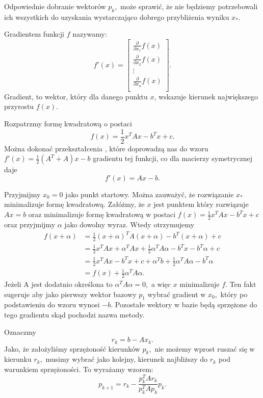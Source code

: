 \documentclass[a4paper,12pt]{book} %
\begin{document}
Odpowiednie dobranie wektorów $p_k,$ może sprawić, że nie będziemy potrzebowali ich wszystkich do uzyskania wystarczająco dobrego przybliżenia wyniku $x_*.$

\begin{df}
Gradientem funkcji $f$ nazywamy:
\[
f'(x) = 
\begin{bmatrix}
\frac{\partial }{\partial x_1}f(x) \\
\frac{\partial }{\partial x_2}f(x) \\
\vdots \\
\frac{\partial }{\partial x_n}f(x) \\
\end{bmatrix}
.
\]
Gradient, to wektor, który dla danego punktu $x$, wskazuje kierunek największego przyrostu $f(x)$.
\end{df}

Rozpatrzmy formę kwadratową o postaci $$f(x) = \frac{1}{2}x^TAx - b^Tx + c.$$ Można dokonać przekształcenia \cite{gradient-quadratic, gradient-quadratic2}, które
doprowadzą nas do wzoru $f'(x) = \frac{1}{2}(A^T + A)x - b$ gradientu tej funkcji, co dla macierzy symetrycznej daje
$$f'(x) = Ax - b.$$

Przyjmijmy $x_0 = 0$ jako punkt startowy. Można zauważyć, że rozwiązanie $x_*$ minimalizuje formę kwadratową. Załóżmy, że $x$ jest punktem który rozwiązuje $Ax = b$ oraz minimalizuje formę kwadratową w postaci $f(x) = \frac{1}{2}x^TAx - b^Tx + c$ oraz przyjmijmy $\alpha$ jako dowolny wyraz. Wtedy otrzymujemy
\begin{align*}
f(x + \alpha) &= \frac{1}{2}(x + \alpha)^TA(x+\alpha)-b^T(x+\alpha)+c \\
	&= \frac{1}{2}x^TAx+\alpha^TAx+\frac{1}{2}\alpha^TA\alpha-b^Tx - b^T\alpha+c \\
	&= \frac{1}{2}x^TAx-b^Tx+c+\alpha^Tb+\frac{1}{2}\alpha^TA\alpha -b^T\alpha \\
	&= f(x) + \frac{1}{2}\alpha^TA\alpha.
\end{align*}
Jeżeli A jest dodatnio określona to $\alpha^TA\alpha = 0,$ a więc $x$ minimalizuje $f.$
Ten fakt sugeruje aby jako pierwszy wektor bazowy $p_1$ wybrać gradient w $x_0,$ który po podstawieniu do wzoru wynosi $-b.$ Pozostałe wektory w bazie będą sprzężone do tego gradientu skąd pochodzi nazwa metody. 

Oznaczmy
$$r_k = b - Ax_k.$$
Jako, że założyliśmy sprzężoność kierunków $p_k,$ nie możemy wprost ruszać się w kierunku $r_k,$ musimy wybrać jako kolejny, kierunek najbliższy do $r_k$ pod warunkiem sprzężoności. To wyrażamy wzorem:
$$p_{k+1} = r_k - \frac{p_k^TAr_k}{p_k^TAp_k}p_k.$$ 
\end{document}
